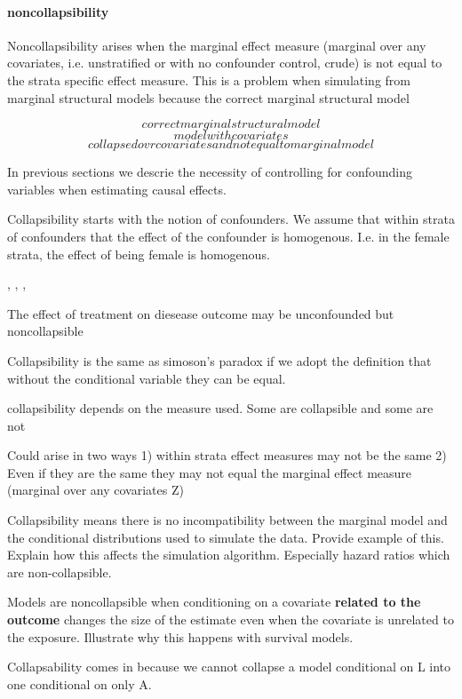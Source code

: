 \documentclass[11pt]{article}
\begin{document}
\paragraph{noncollapsibility}\label{noncollapsibility}

Noncollapsibility arises when the marginal effect measure (marginal over
any covariates, i.e. unstratified or with no confounder control, crude)
is not equal to the strata specific effect measure. This is a problem
when simulating from marginal structural models because the correct
marginal structural model

\[correct marginal structural model\] \[model with covariates\]
\[collapsed ovr covariates and not equal to marginal model\]

In previous sections we descrie the necessity of controlling for
confounding variables when estimating causal effects.

Collapsibility starts with the notion of confounders. We assume that
within strata of confounders that the effect of the confounder is
homogenous. I.e. in the female strata, the effect of being female is
homogenous.

\citet{Greenland1996}, \citet{Greenland1999}, \citet{Greenland2011},
\citet{Sjoelander2016}

The effect of treatment on diesease outcome may be unconfounded but
noncollapsible

Collapsibility is the same as simoson's paradox if we adopt the
definition that without the conditional variable they can be equal.

collapsibility depends on the measure used. Some are collapsible and
some are not

Could arise in two ways 1) within strata effect measures may not be the
same 2) Even if they are the same they may not equal the marginal effect
measure (marginal over any covariates Z)

Collapsibility means there is no incompatibility between the marginal
model and the conditional distributions used to simulate the data.
Provide example of this. Explain how this affects the simulation
algorithm. Especially hazard ratios which are non-collapsible.

Models are noncollapsible when conditioning on a covariate
\textbf{related to the outcome} changes the size of the estimate even
when the covariate is unrelated to the exposure. Illustrate why this
happens with survival models.

Collapsability comes in because we cannot collapse a model conditional
on L into one conditional on only A.
\end{document}
